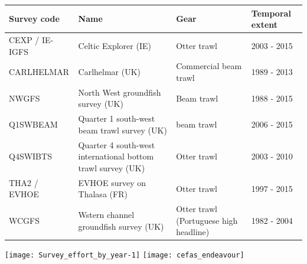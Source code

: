 \documentclass[xcolor=x11names,compress]{beamer}
\renewcommand{\(}{\begin{columns}}
\renewcommand{\)}{\end{columns}}
\newcommand{\<}[1]{\begin{column}{#1}}
\renewcommand{\>}{\end{column}}
\begin{document}
\begin{frame}

\begin{table}[!htb]
	\tiny
	\center
	\begin{tabular}{ p{1.5cm} p{3cm} p{2cm} p{1.5cm} }
		\hline
		Survey code    & Name 	& Gear & Temporal extent \\
		\hline
		CEXP / IE-IGFS & Celtic Explorer (IE)   & Otter trawl & 2003 - 2015 \\
		CARLHELMAR     & Carlhelmar (UK)	& Commercial beam trawl & 1989 - 2013 \\
		NWGFS          & North West groundfish survey (UK) & Beam trawl & 1988 - 2015 \\
		Q1SWBEAM       & Quarter 1 south-west beam trawl survey (UK) 	& beam trawl & 2006 - 2015 \\
		Q4SWIBTS       & Quarter 4 south-west international bottom trawl survey (UK) & Otter trawl & 2003 - 2010 \\
		THA2 / EVHOE    & EVHOE survey on Thalasa (FR) & Otter trawl & 1997 - 2015 \\
		WCGFS          & Wstern channel groundfish survey (UK) & Otter
		trawl (Portuguese high headline) & 1982 - 2004 \\
		\hline
	\end{tabular}
	
\end{table}

\texttt{[image: Survey\_effort\_by\_year-1]}
\texttt{[image: cefas\_endeavour]}

\end{frame}
\end{document}
